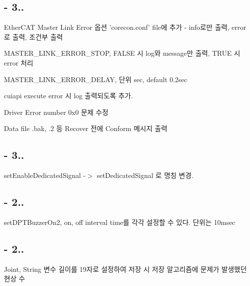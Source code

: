 \subsection*{-\/ 3..}


\begin{DoxyEnumerate}
\item Ether\-C\-A\-T Master Link Error 옵션 'corecon.\-conf' file에 추가 -\/ info로만 출력, error로 출력, 조건부 출력
\begin{DoxyItemize}
\item M\-A\-S\-T\-E\-R\-\_\-\-L\-I\-N\-K\-\_\-\-E\-R\-R\-O\-R\-\_\-\-S\-T\-O\-P, F\-A\-L\-S\-E 시 log와 message만 출력, T\-R\-U\-E 시 error 처리
\item M\-A\-S\-T\-E\-R\-\_\-\-L\-I\-N\-K\-\_\-\-E\-R\-R\-O\-R\-\_\-\-D\-E\-L\-A\-Y, 단위 sec, default 0.\-2sec
\end{DoxyItemize}
\item cuiapi execute error 시 log 출력되도록 추가.
\item Driver Error number 0x0 문제 수정
\item Data file .bak, .2 등 Recover 전에 Conform 메시지 출력
\end{DoxyEnumerate}

\subsection*{-\/ 3..}


\begin{DoxyEnumerate}
\item set\-Enable\-Dedicated\-Signal -\/$>$ set\-Dedicated\-Signal 로 명칭 변경.
\end{DoxyEnumerate}

\subsection*{-\/ 2..}


\begin{DoxyEnumerate}
\item set\-D\-P\-T\-Buzzer\-On2, on, off interval time를 각각 설정할 수 있다. 단위는 10msec
\end{DoxyEnumerate}

\subsection*{-\/ 2..}


\begin{DoxyEnumerate}
\item Joint, String 변수 길이를 19자로 설정하여 저장 시 저장 알고리즘에 문제가 발생했던 현상 수
\end{DoxyEnumerate}


